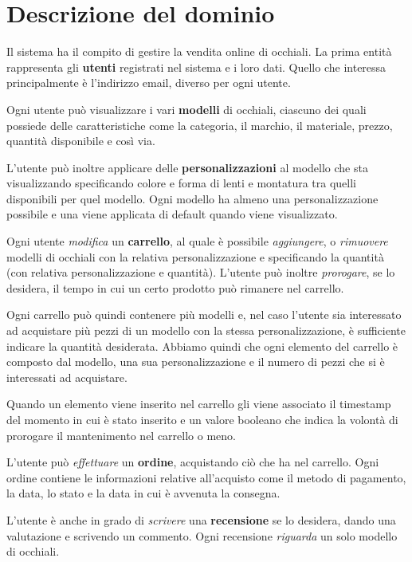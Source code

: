 \section{Descrizione del dominio}
Il sistema ha il compito di gestire la vendita online di occhiali. La prima entità rappresenta
gli \textbf{utenti} registrati nel sistema e i loro dati. Quello che interessa principalmente
è l'indirizzo email, diverso per ogni utente.

Ogni utente può visualizzare i vari \textbf{modelli} di occhiali, ciascuno dei quali possiede
delle caratteristiche come la categoria, il marchio, il materiale, prezzo, quantità disponibile
e così via.

L'utente può inoltre applicare delle \textbf{personalizzazioni} al modello che sta visualizzando
specificando colore e forma di lenti e montatura tra quelli disponibili per quel modello. Ogni
modello ha almeno una personalizzazione possibile e una viene applicata di default quando viene
visualizzato.

Ogni utente \emph{modifica} un \textbf{carrello}, al quale è possibile \emph{aggiungere}, o
\emph{rimuovere} modelli di occhiali con la relativa personalizzazione e specificando la quantità
(con relativa personalizzazione e quantità). L'utente può inoltre \emph{prorogare}, se lo desidera,
il tempo in cui un certo prodotto può rimanere nel carrello.

Ogni carrello può quindi contenere più modelli e, nel caso l'utente sia interessato ad acquistare
più pezzi di un modello con la stessa personalizzazione, è sufficiente indicare la quantità
desiderata. Abbiamo quindi che ogni elemento del carrello è composto dal modello, una sua
personalizzazione e il numero di pezzi che si è interessati ad acquistare.

Quando un elemento viene inserito nel carrello gli viene associato il timestamp del momento in cui
è stato inserito e un valore booleano che indica la volontà di prorogare il mantenimento nel
carrello o meno.

L'utente può \emph{effettuare} un \textbf{ordine}, acquistando ciò che ha nel carrello.
Ogni ordine contiene le informazioni relative all'acquisto come il metodo di pagamento, la data,
lo stato e la data in cui è avvenuta la consegna.

L'utente è anche in grado di \emph{scrivere} una \textbf{recensione} se lo desidera, dando una
valutazione e scrivendo un commento. Ogni recensione \emph{riguarda} un solo modello di occhiali.

